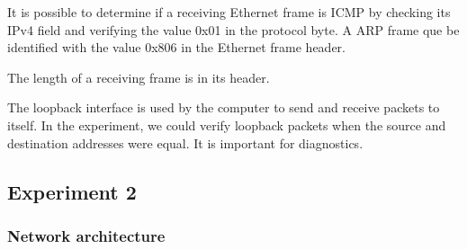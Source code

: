 \documentclass[a4paper, 11pt]{report}
\begin{document}
It is possible to determine if a receiving Ethernet frame is ICMP by checking its IPv4 field and verifying the value 0x01 in the protocol byte.
A ARP frame que be identified with the value 0x806 in the Ethernet frame header.

The length of a receiving frame is in its header.

The loopback interface is used by the computer to send and receive packets to itself.
In the experiment, we could verify loopback packets when the source and destination addresses were equal.
It is important for diagnostics.


\subsection{Experiment 2} \label{sec:Exp2}
\subsubsection{Network architecture} \label{sec:Arc2}
\end{document}

